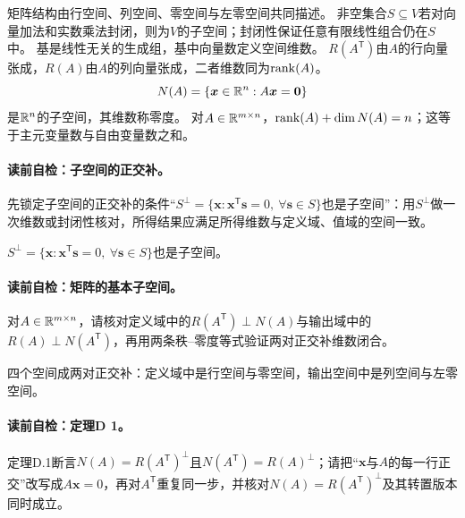矩阵结构由行空间、列空间、零空间与左零空间共同描述。
非空集合$S\subseteq V$若对向量加法和实数乘法封闭，则为$V$的子空间；封闭性保证任意有限线性组合仍在$S$中。
基是线性无关的生成组，基中向量数定义空间维数。
$R(A^{\mathsf T})$由$A$的行向量张成，$R(A)$由$A$的列向量张成，二者维数同为$\operatorname{rank}(A)$。
\[
N(A)=\{\boldsymbol{x}\in\mathbb{R}^n:A\boldsymbol{x}=\boldsymbol0\}
\]
是$\mathbb{R}^n$的子空间，其维数称零度。
对$A\in\mathbb{R}^{m\times n}$，$\operatorname{rank}(A)+\dim N(A)=n$；这等于主元变量数与自由变量数之和。
\paragraph{读前自检：子空间的正交补。}先锁定子空间的正交补的条件“$S^{\perp}=\{\boldsymbol{x}:\boldsymbol{x}^{\mathsf T}\boldsymbol{s}=0,\ \forall\boldsymbol{s}\in S\}$也是子空间”：用$S^{\perp}$做一次维数或封闭性核对，所得结果应满足所得维数与定义域、值域的空间一致。\par

$S^{\perp}=\{\boldsymbol{x}:\boldsymbol{x}^{\mathsf T}\boldsymbol{s}=0,\ \forall\boldsymbol{s}\in S\}$也是子空间。
\paragraph{读前自检：矩阵的基本子空间。}对$A\in\mathbb{R}^{m\times n}$，请核对定义域中的$R(A^{\mathsf T})\perp N(A)$与输出域中的$R(A)\perp N(A^{\mathsf T})$，再用两条秩--零度等式验证两对正交补维数闭合。\par

四个空间成两对正交补：定义域中是行空间与零空间，输出空间中是列空间与左零空间。
\paragraph{读前自检：定理D 1。}定理D.1断言$N(A)=R(A^{\mathsf T})^{\perp}$且$N(A^{\mathsf T})=R(A)^{\perp}$；请把“$\boldsymbol{x}$与$A$的每一行正交”改写成$A\boldsymbol{x}=0$，再对$A^{\mathsf T}$重复同一步，并核对$N(A)=R(A^{\mathsf T})^\perp$及其转置版本同时成立。\par


